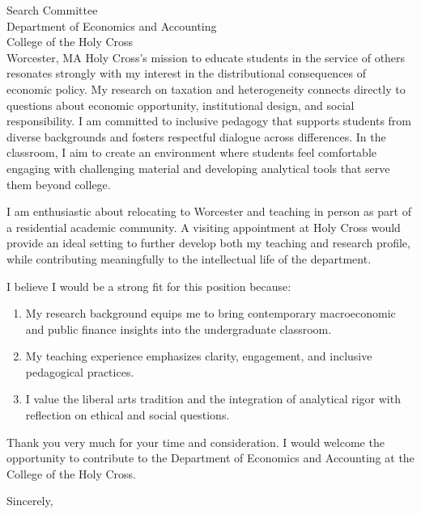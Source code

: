 \documentclass[11pt,letterpaper]{letter}
\begin{document}
\begin{letter}{
Search Committee \\
Department of Economics and Accounting \\
College of the Holy Cross \\
Worcester, MA
}
Holy Cross’s mission to educate students in the service of others resonates strongly with my interest in the distributional consequences of economic policy. My research on taxation and heterogeneity connects directly to questions about economic opportunity, institutional design, and social responsibility. I am committed to inclusive pedagogy that supports students from diverse backgrounds and fosters respectful dialogue across differences. In the classroom, I aim to create an environment where students feel comfortable engaging with challenging material and developing analytical tools that serve them beyond college.

I am enthusiastic about relocating to Worcester and teaching in person as part of a residential academic community. A visiting appointment at Holy Cross would provide an ideal setting to further develop both my teaching and research profile, while contributing meaningfully to the intellectual life of the department.

I believe I would be a strong fit for this position because:
\begin{enumerate}
    \item My research background equips me to bring contemporary macroeconomic and public finance insights into the undergraduate classroom.
    \item My teaching experience emphasizes clarity, engagement, and inclusive pedagogical practices.
    \item I value the liberal arts tradition and the integration of analytical rigor with reflection on ethical and social questions.
\end{enumerate}

Thank you very much for your time and consideration. I would welcome the opportunity to contribute to the Department of Economics and Accounting at the College of the Holy Cross.

\closing{Sincerely,}

\end{letter}
\end{document}
